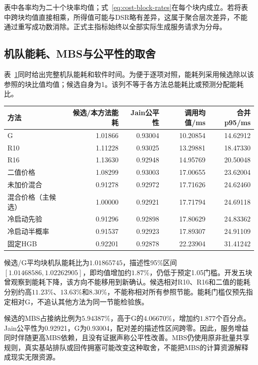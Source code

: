 表中各率均为二十个块率均值；式~\eqref{eq:cost-block-rates}在每个块内成立。若将表中跨块均值直接相乘，所得值可能与DSR略有差异，这属于聚合层次差异，不能通过重写成功数消除。正式主指标始终以全部实际生成服务请求为分母。

\subsection{机队能耗、MBS与公平性的取舍}
表~\ref{tab:cost-resources}同时给出完整机队能耗和软件时间。为便于逐项对照，能耗列采用候选除以该参照的块比值均值；候选自身为1。该列不等于各方法总能耗比或预测分配能耗比。

\begin{table}[!htbp]
\centering
{}
\label{tab:cost-resources}
\small
\begin{tabular}{lrrrr}
\toprule
方法 & 候选/本方法能耗 & Jain公平性 & 调用均值/ms & 合并p95/ms\\
\midrule
G & 1.01866 & 0.93004 & 10.20854 & 14.62912\\
R10 & 1.11228 & 0.93025 & 13.29881 & 18.47330\\
R16 & 1.13630 & 0.92948 & 14.95769 & 20.50048\\
二值价格 & 1.08299 & 0.93003 & 17.00655 & 23.62004\\
未加价混合 & 0.91278 & 0.92972 & 17.71626 & 24.62460\\
混合价格（主候选） & 1.00000 & 0.92921 & 17.71794 & 24.69118\\
冷启动先验 & 0.91296 & 0.92898 & 17.80629 & 24.83362\\
冷启动半概率 & 0.91537 & 0.92923 & 17.89307 & 24.91109\\
固定HGB & 0.92201 & 0.92878 & 22.23904 & 31.41242\\
\bottomrule
\end{tabular}
\end{table}

候选/G平均块机队能耗比为$1.01865745$，描述性95\%区间$[1.01468586,1.02262905]$，即均值增加约$1.87\%$，仍低于预定1.05门槛。开发五块曾观察到能耗下降，该方向不能移用到新确认。候选相对R10、R16和二值的能耗分别约高$11.23\%$、$13.63\%$和$8.30\%$，不能称相对所有参照节能。能耗门槛仅预先指定相对G，不追认其他方法为同一节能检验族。

候选的MBS占接纳比例为$5.94387\%$，高于G的$4.06670\%$，增加约$1.877$个百分点。Jain公平性为0.92921，G为0.93004，配对差的描述性区间跨零。因此，服务增益同时伴随更高MBS依赖，且没有证据声称公平性改善。MBS仍使用原非批量共享规则，真实基站排队或回传拥塞可能改变这种取舍，不能把MBS的计算资源解释成现实无限资源。

